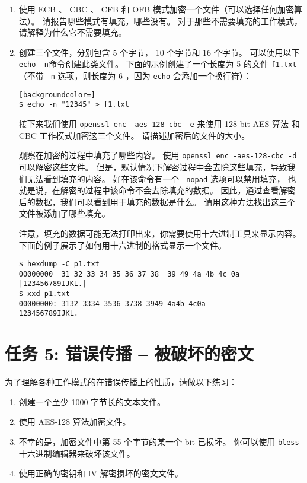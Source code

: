\begin{enumerate}
\item 使用 ECB 、 CBC 、 CFB 和 OFB 模式加密一个文件（可以选择任何加密算法）。
请报告哪些模式有填充，哪些没有。
对于那些不需要填充的工作模式，请解释为什么它不需要填充。


\item 创建三个文件，分别包含 5 个字节， 10 个字节和 16 个字节。
可以使用以下 \texttt{echo -n}命令创建此类文件。
下面的示例创建了一个长度为 5 的文件 \texttt{f1.txt}
（不带 \texttt{-n} 选项，则长度为 6 ，因为 \texttt{echo} 会添加一个换行符）：

\begin{lstlisting}[backgroundcolor=]
$ echo -n "12345" > f1.txt
\end{lstlisting}

接下来我们使用 \texttt{openssl enc -aes-128-cbc -e} 来使用 128-bit AES 算法
和 CBC 工作模式加密这三个文件。
请描述加密后的文件的大小。

观察在加密的过程中填充了哪些内容。
使用 \texttt{openssl enc -aes-128-cbc -d} 可以解密这些文件。
但是，默认情况下解密过程中会去除这些填充，导致我们无法看到填充的内容。
好在该命令有一个 \texttt{-nopad} 选项可以禁用填充，
也就是说，在解密的过程中该命令不会去除填充的数据。
因此，通过查看解密后的数据，我们可以看到用于填充的数据是什么。
请用这种方法找出这三个文件被添加了哪些填充。

注意，填充的数据可能无法打印出来，你需要使用十六进制工具来显示内容。
下面的例子展示了如何用十六进制的格式显示一个文件。

\begin{lstlisting}
$ hexdump -C p1.txt
00000000  31 32 33 34 35 36 37 38  39 49 4a 4b 4c 0a   |123456789IJKL.|
$ xxd p1.txt
00000000: 3132 3334 3536 3738 3949 4a4b 4c0a            123456789IJKL.
\end{lstlisting}

\end{enumerate}



\section{任务 5: 错误传播 -- 被破坏的密文}

为了理解各种工作模式的在错误传播上的性质，请做以下练习：

\begin{enumerate}
\item 创建一个至少 1000 字节长的文本文件。
\item 使用 AES-128 算法加密文件。
\item 不幸的是，加密文件中第 55 个字节的某一个 bit 已损坏。
      你可以使用 \texttt{bless} 十六进制编辑器来破坏该文件。
\item 使用正确的密钥和 IV 解密损坏的密文文件。
\end{enumerate}

